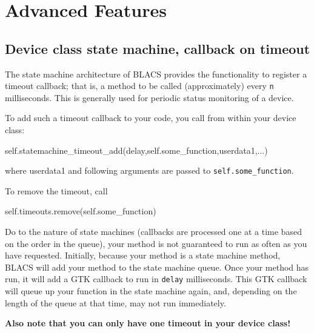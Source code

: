 \documentclass[12pt]{article}
\begin{document}
\section{Advanced Features}

\subsection{Device class state machine, callback on timeout}
The state machine architecture of BLACS provides the functionality to register a timeout callback; that is, a method to be called (approximately) every \texttt{n} milliseconds. This is generally used for periodic status monitoring of a device.

To add such a timeout callback to your code, you call from within your device class:
\begin{python}
self.statemachine_timeout_add(delay,self.some_function,userdata1,...)
\end{python}
where userdata1 and following arguments are passed to \texttt{self.some\_function}.

To remove the timeout, call 
\begin{python}
self.timeouts.remove(self.some_function)
\end{python}

Do to the nature of state machines (callbacks are processed one at a time based on the order in the queue), your method is not guaranteed to run as often as you have requested. Initially, because your method is a state machine method, BLACS will add your method to the state machine queue. Once your method has run, it will add a GTK callback to run in \texttt{delay} milliseconds. This GTK callback will queue up your function in the state machine again, and, depending on the length of the queue at that time, may not run immediately. 

\textbf{Also note that you can only have one timeout in your device class!}
\end{document}
